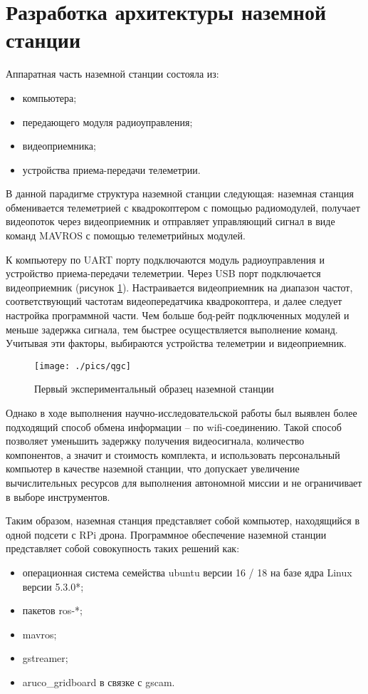 \section{Разработка архитектуры наземной станции}

Аппаратная часть наземной станции состояла из:
\begin{itemize}
	\item компьютера;
	\item передающего модуля радиоуправления;
	\item видеоприемника;
	\item устройства приема-передачи телеметрии.
\end{itemize}
В данной парадигме структура наземной станции следующая: наземная станция обменивается телеметрией с квадрокоптером с помощью радиомодулей, получает видеопоток через видеоприемник и отправляет управляющий сигнал в виде команд MAVROS с помощью телеметрийных модулей.
 
К компьютеру по UART порту подключаются модуль радиоуправления и устройство приема-передачи телеметрии. Через USB порт подключается видеоприемник (рисунок \ref{fig:ns}). Настраивается видеоприемник на диапазон частот, соответствующий частотам видеопередатчика квадрокоптера, и далее следует настройка программной части.
Чем больше бод-рейт подключенных модулей и меньше задержка сигнала, тем быстрее осуществляется выполнение команд. Учитывая эти факторы, выбираются устройства телеметрии и видеоприемник.

\begin{figure}[H]
	\centering
	\texttt{[image: ./pics/qgc]}
	\caption{Первый экспериментальный образец наземной станции
	}
	\label{fig:ns} %
\end{figure}

Однако в ходе выполнения научно-исследовательской работы \cite{nir3} был выявлен более подходящий способ обмена информации -- по wifi-соединению. Такой способ позволяет уменьшить задержку получения видеосигнала, количество компонентов, а значит и стоимость комплекта, и использовать персональный компьютер в качестве наземной станции, что допускает увеличение вычислительных ресурсов для выполнения автономной миссии и не ограничивает в выборе инструментов.

Таким образом, наземная станция представляет собой компьютер, находящийся в одной подсети с RPi дрона.
Программное обеспечение наземной станции представляет собой совокупность таких решений как:
\begin{itemize}
	\item операционная система семейства ubuntu версии 16 / 18 на базе ядра Linux версии 5.3.0*;
	\item пакетов ros-*;
	\item mavros;
	\item gstreamer;
	\item aruco\_gridboard в связке с gscam.
\end{itemize}

